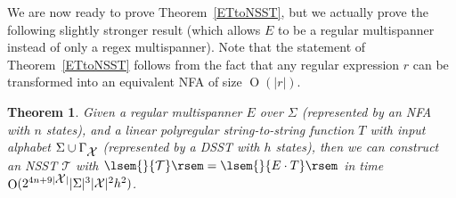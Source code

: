 \documentclass[
a4paper
]{article}
\theoremstyle{plain}
\newtheorem{theorem}{Theorem}[section]
\theoremstyle{definition}
\theoremstyle{remark}
\newcommand{\varset}{\mbox{\ensuremath{\mathcal{X}}}}
\newcommand{\sst}{\mathcal{T}}
\newcommand{\sem}[1]{{\lsem{}{#1}\rsem}}
\DeclareMathOperator{\bigo}{O}
\begin{document}
We are now ready to prove Theorem~\ref{ETtoNSST}, but we actually prove the following slightly stronger result (which allows $E$ to be a regular multispanner instead of only a regex multispanner). Note that the statement of Theorem~\ref{ETtoNSST} follows from the fact that any regular expression $r$ can be transformed into an equivalent NFA of size $\bigo(|r|)$.



\begin{theorem}
Given a regular multispanner $E$ over $\Sigma$ (represented by an NFA with $n$ states), and a linear polyregular string-to-string function $T$ with input alphabet $\Sigma \cup \Gamma_{\varset}$ (represented by a DSST with $h$ states), then we can construct an NSST $\sst$ with $\sem{\sst} = \sem{E \cdot T}$ in time $\bigo(2^{4n+9|\varset|} |\Sigma|^3 |\varset|^2 h^2)$.
\end{theorem}
\end{document}
